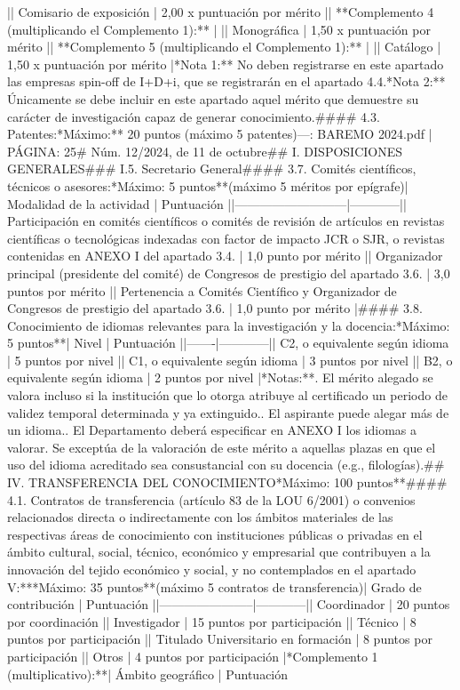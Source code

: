 \documentclass{article}
\begin{document}
\begin{itemize}
{{{{{{           |\n| Comisario de exposición                    | 2,00 x puntuación por mérito  |\n| **Complemento 4 (multiplicando el Complemento 1):** |                       |\n| Monográfica                                | 1,50 x puntuación por mérito  |\n| **Complemento 5 (multiplicando el Complemento 1):** |                       |\n| Catálogo                                   | 1,50 x puntuación por mérito  |\n\n**Nota 1:** No deben registrarse en este apartado las empresas spin-off de I+D+i, que se registrarán en el apartado 4.4.\n**Nota 2:** Únicamente se debe incluir en este apartado aquel mérito que demuestre su carácter de investigación capaz de generar conocimiento.\n\n#### 4.3. Patentes:\n**Máximo:** 20 puntos (máximo 5 patentes)\n\n---\n\nFUENTE: BAREMO 2024.pdf | PÁGINA: 25\n# Núm. 12/2024, de 11 de octubre\n\n## I. DISPOSICIONES GENERALES\n\n### I.5. Secretario General\n\n#### 3.7. Comités científicos, técnicos o asesores:\n**Máximo: 5 puntos**\n(máximo 5 méritos por epígrafe)\n\n| Modalidad de la actividad | Puntuación |\n|---------------------------|------------|\n| Participación en comités científicos o comités de revisión de artículos en revistas científicas o tecnológicas indexadas con factor de impacto JCR o SJR, o revistas contenidas en ANEXO I del apartado 3.4. | 1,0 punto por mérito |\n| Organizador principal (presidente del comité) de Congresos de prestigio del apartado 3.6. | 3,0 puntos por mérito |\n| Pertenencia a Comités Científico y Organizador de Congresos de prestigio del apartado 3.6. | 1,0 punto por mérito |\n\n#### 3.8. Conocimiento de idiomas relevantes para la investigación y la docencia:\n**Máximo: 5 puntos**\n\n| Nivel | Puntuación |\n|-------|------------|\n| C2, o equivalente según idioma | 5 puntos por nivel |\n| C1, o equivalente según idioma | 3 puntos por nivel |\n| B2, o equivalente según idioma | 2 puntos por nivel |\n\n**Notas:**. El mérito alegado se valora incluso si la institución que lo otorga atribuye al certificado un periodo de validez temporal determinada y ya extinguido.. El aspirante puede alegar más de un idioma.. El Departamento deberá especificar en ANEXO I los idiomas a valorar. Se exceptúa de la valoración de este mérito a aquellas plazas en que el uso del idioma acreditado sea consustancial con su docencia (e.g., filologías).\n\n## IV. TRANSFERENCIA DEL CONOCIMIENTO\n**Máximo: 100 puntos**\n\n#### 4.1. Contratos de transferencia (artículo 83 de la LOU 6/2001) o convenios relacionados directa o indirectamente con los ámbitos materiales de las respectivas áreas de conocimiento con instituciones públicas o privadas en el ámbito cultural, social, técnico, económico y empresarial que contribuyen a la innovación del tejido económico y social, y no contemplados en el apartado V:**\n**Máximo: 35 puntos**\n(máximo 5 contratos de transferencia)\n\n| Grado de contribución | Puntuación |\n|-----------------------|------------|\n| Coordinador           | 20 puntos por coordinación |\n| Investigador          | 15 puntos por participación |\n| Técnico               | 8 puntos por participación |\n| Titulado Universitario en formación | 8 puntos por participación |\n| Otros                 | 4 puntos por participación |\n\n**Complemento 1 (multiplicativo):**\n| Ámbito geográfico | Puntuación }}}}}}
\end{itemize}
\end{document}

